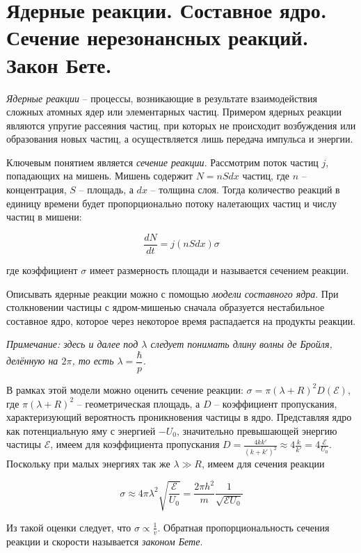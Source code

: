 \section{Ядерные реакции. Составное ядро. Сечение нерезонансных реакций. Закон Бете.}

\textit{Ядерные реакции} -- процессы, возникающие в результате взаимодействия сложных атомных ядер или элементарных частиц. Примером ядерных реакции являются упругие рассеяния частиц, при которых не происходит возбуждения или образования новых частиц, а осуществляется лишь передача импульса и энергии.

Ключевым понятием является \textit{сечение реакции}. Рассмотрим поток частиц $j$, попадающих на мишень. Мишень содержит $N = n S dx$ частиц, где $n$ -- концентрация, $S$ -- площадь, а $dx$ -- толщина слоя. Тогда количество реакций в единицу времени будет пропорционально потоку налетающих частиц и числу частиц в мишени:

\begin{equation}
    \frac{dN}{dt} = j \left( n S dx \right) \sigma
\end{equation}

\noindent
где коэффициент $\sigma$ имеет размерность площади и называется сечением реакции.

Описывать ядерные реакции можно с помощью \textit{модели составного ядра}. При столкновении частицы с ядром-мишенью сначала образуется нестабильное составное ядро, которое через некоторое время распадается на продукты реакции.

\textit{Примечание: здесь и далее под $\lambda$ следует понимать длину волны де Бройля, делённую на $2 \pi$, то есть $\lambda = \dfrac{\hbar}{p}$.}

В рамках этой модели можно оценить сечение реакции: $\sigma = \pi (\lambda + R)^2 D(\mathcal{E})$, где $\pi (\lambda + R)^2$ -- геометрическая площадь, а $D$ -- коэффициент пропускания, характеризующий вероятность проникновения частицы в ядро. Представляя ядро как потенциальную яму с энергией $- U_0$, значительно превышающей энергию частицы $\mathcal{E}$, имеем для коэффициента пропускания $D = \frac{4 k k'}{\left( k + k' \right)^2} \approx 4 \frac{k}{k'} = 4 \frac{\mathcal{E}}{U_0}$. Поскольку при малых энергиях так же $\lambda \gg R$, имеем для сечения реакции

\begin{equation}
    \sigma \approx 4 \pi \lambda^2 \sqrt{\frac{\mathcal{E}}{U_0}} = \frac{2 \pi h^2}{m} \frac{1}{\sqrt{\mathcal{E} U_0}}
\end{equation}

\noindent
Из такой оценки следует, что $\sigma \propto \frac{1}{v}$. Обратная пропорциональность сечения реакции и скорости называется \textit{законом Бете}.